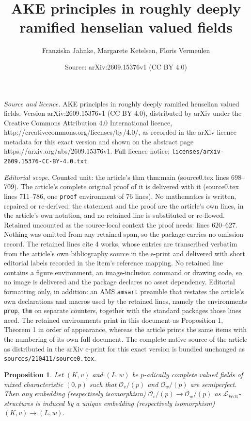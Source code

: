\documentclass[10pt,a4paper]{amsart}
\title{AKE principles in roughly deeply ramified henselian valued fields}
\author{Franziska Jahnke, Margarete Ketelsen, Floris Vermeulen}
\date{Source: arXiv:2609.15376v1 (CC BY 4.0)}
\newtheorem{prop}{Proposition}
\renewcommand{\L}{\mathcal{L}}
\newcommand{\LWitt}{\L_{\mathrm{Witt}}}
\renewcommand{\O}{\mathcal{O}}
\begin{document}
\maketitle

\noindent\emph{Source and licence.} AKE principles in roughly deeply ramified henselian valued fields. Version arXiv:2609.15376v1 (CC BY 4.0), distributed by arXiv under the Creative Commons Attribution 4.0 International licence, http://creativecommons.org/licenses/by/4.0/, as recorded in the arXiv licence metadata for this exact version and shown on the abstract page https://arxiv.org/abs/2609.15376v1. Full licence notice: \texttt{licenses/arxiv-2609.15376-CC-BY-4.0.txt}.\par\smallskip

\noindent\textit{Editorial scope.} Counted unit: the article's thm thm:main (source0.tex lines 698--709). The article's complete original proof of it is delivered with it (source0.tex lines 711--786, one \texttt{proof} environment of 76 lines). No mathematics is written, repaired or re-derived: the statement and the proof are the article's own lines, in the article's own notation, and no retained line is substituted or re-flowed.  Retained uncounted as the source-local context the proof needs: lines 620--627.  Nothing was omitted from any retained span, so the package carries no omission record.  The retained lines cite 4 works, whose entries are transcribed verbatim from the article's own bibliography source in the e-print and delivered with short editorial labels recorded in the item's reference mapping.  No retained line contains a figure environment, an image-inclusion command or drawing code, so no image is delivered and the package declares no asset dependency.  Editorial formatting only, in addition: an AMS \texttt{amsart} preamble that restates the article's own declarations and macros used by the retained lines, namely the environments \texttt{prop}, \texttt{thm} on separate counters, together with the standard packages those lines need.  The retained environments print in this document as Proposition 1, Theorem 1 in order of appearance, whereas the article prints the same items with the numbering of its own full document.  The complete native source of the article as distributed in the arXiv e-print for this exact version is bundled unchanged as \texttt{sources/210411/source0.tex}.
    \begin{prop} \label{prop:lift}
        Let $(K,v)$ and $(L,w)$ be $p$-adically complete valued fields of mixed characteristic $(0,p)$
        such that $\O_v/(p)$ and $\O_w/(p)$ are semiperfect. 
        Then any embedding (respectively isomorphism)  
        $\O_v/(p) \to \O_w/(p)$ as $\LWitt$-structures is induced by a
        unique embedding (respectively
        isomorphism) $(K,v) \to (L,w).$
    \end{prop}
\end{document}
